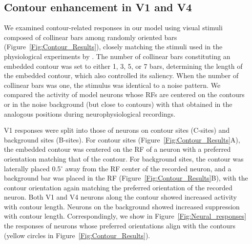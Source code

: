 \subsection{Contour enhancement in V1 and V4}
We examined contour-related responses in our model using visual stimuli composed of collinear bars among randomly oriented bars (Figure~\ref{Fig:Contour_Results}), closely matching the stimuli used
in the physiological experiments by \cite{Chen_etal14}. The number of
collinear bars constituting an embedded contour was set to either 1, 3, 5, or 7 bars, determining the length of the embedded contour, which also controlled its saliency. When the number of collinear bars was one, the stimulus was identical to a noise pattern. We compared the activity of model neurons whose RFs are centered on the contours or in the noise background (but close to contours) with that obtained in the analogous positions during neurophysiological recordings.

V1 responses were split into those of neurons on contour sites (C-sites) and background sites (B-sites). For contour sites (Figure~\ref{Fig:Contour_Results}A), the embedded contour was centered on the RF of a neuron with a preferred orientation matching that of the contour. For background sites, the contour was laterally placed 0.5$^{\circ}$ away from the RF center of the recorded neuron, and a background bar was placed in the RF (Figure~\ref{Fig:Contour_Results}B), with the contour orientation again matching the preferred orientation of the recorded neuron. Both V1 and V4 neurons along the contour showed increased activity with contour length. Neurons on the background showed increased suppression with contour length. Correspondingly, we  show in Figure~\ref{Fig:Neural_responses} the responses of neurons whose preferred orientations align with the contours (yellow circles in Figure~\ref{Fig:Contour_Results}).

